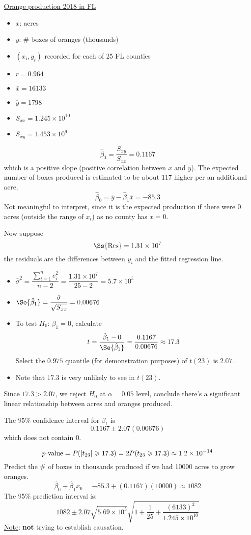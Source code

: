 \underline{Orange production 2018 in FL}
\begin{itemize}
    \item $ x $: acres
    \item $ y $: \# boxes of oranges (thousands)
    \item $ (x_i,y_i) $ recorded for each of 25 FL counties
    \item $ r=0.964 $
    \item $ \bar{x}=16133 $
    \item $ \bar{y}=1798 $
    \item $ S_{xx}=1.245\times 10^{10} $
    \item $ S_{xy}=1.453\times 10^9 $
\end{itemize}
\[ \hat{\beta}_1=\frac{S_{xy}}{S_{xx}}=0.1167 \]
which is a positive slope (positive correlation between $ x $ and $ y $).
The expected number of boxes produced is estimated to be about 117
higher per an additional acre.
\[ \hat{\beta}_0=\bar{y}-\hat{\beta}_1\bar{x}=-85.3 \]
Not meaningful to interpret, since it
is the expected production if there were 0 acres
(outside the range of $ x_i $) as no county has $ x=0 $.

Now suppose
\[ \Ss{\text{Res}}=1.31\times 10^7 \]
the residuals are the differences between $ y_i $ and the fitted regression
line.
\begin{itemize}
    \item $ \hat{\sigma}^2=\dfrac{\sum\limits_{i=1}^{n} e_i^2}{n-2}=
              \dfrac{1.31\times 10^7}{25-2}=5.7\times 10^5 $
    \item $ \Se{\hat{\beta}_1}=\dfrac{\hat{\sigma}}{\sqrt{S_{xx}}}=0.00676 $
    \item To test $ H_0 $: $ \beta_1 =0 $,
          calculate
          \[ t=\frac{\hat{\beta}_1-0}{\Se{\hat{\beta}_1}}=\frac{0.1167}{0.00676}
              \approx 17.3 \]
          Select the $ 0.975 $ quantile (for demonstration purposes) of $ t(23) $
          is $ 2.07 $.
    \item Note that $ 17.3 $ is very unlikely to see in $ t(23) $.
\end{itemize}
Since $ 17.3>2.07 $, we reject $ H_0 $ at $ \alpha=0.05 $
level, conclude there's a significant linear relationship between
acres and oranges produced.

The $ 95\% $ confidence interval for $ \beta_1 $ is
\[ 0.1167\pm 2.07(0.00676) \]
which does not contain $ 0 $.

\[ p\text{-value}=P(\lvert t_{23}\rvert\geqslant 17.3)=
    2P(t_{23}\geqslant 17.3)\approx 1.2\times 10^{-14} \]
Predict the \# of boxes in thousands produced if we had
10000 acres to grow oranges.
\[ \hat{\beta}_0+\hat{\beta}_1x_0=-85.3+(0.1167)(10000)\approx 1082 \]
The 95\% prediction interval is:
\[ 1082\pm 2.07\sqrt{5.69\times 10^5}\sqrt{1+\frac{1}{25}+
        \frac{(6133)^2}{1.245\times 10^{10}} } \]
\underline{Note}: \textbf{not} trying to establish causation.

